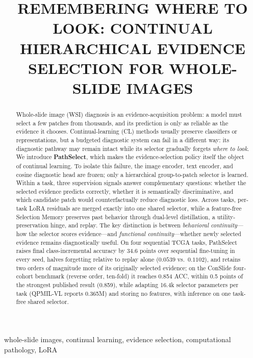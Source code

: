\documentclass{article}
\title{REMEMBERING WHERE TO LOOK: CONTINUAL HIERARCHICAL EVIDENCE SELECTION FOR WHOLE-SLIDE IMAGES}
\begin{document}
\ninept
\maketitle

\begin{abstract}
Whole-slide image (WSI) diagnosis is an evidence-acquisition problem: a model must select a few patches from thousands, and its prediction is only as reliable as the evidence it chooses.
Continual-learning (CL) methods usually preserve classifiers or representations, but a budgeted diagnostic system can fail in a different way: its diagnostic pathway may remain intact while its selector gradually forgets \emph{where to look}.
We introduce \textbf{PathSelect}, which makes the evidence-selection policy itself the object of continual learning.
To isolate this failure, the image encoder, text encoder, and cosine diagnostic head are frozen; only a hierarchical group-to-patch selector is learned.
Within a task, three supervision signals answer complementary questions: whether the selected evidence predicts correctly, whether it is semantically discriminative, and which candidate patch would counterfactually reduce diagnostic loss.
Across tasks, per-task LoRA residuals are merged exactly into one shared selector, while a feature-free Selection Memory preserves past behavior through dual-level distillation, a utility-preservation hinge, and replay.
The key distinction is between \emph{behavioral continuity}---how the selector scores evidence---and \emph{functional continuity}---whether newly selected evidence remains diagnostically useful.
On four sequential TCGA tasks, PathSelect raises final class-incremental accuracy by 34.6 points over sequential fine-tuning in every seed, halves forgetting relative to replay alone ($0.0539$ vs.\ $0.1102$), and retains two orders of magnitude more of its originally selected evidence; on the ConSlide four-cohort benchmark (reverse order, ten-fold) it reaches 0.854 ACC, within 0.5 points of the strongest published result (0.859), while adapting 16.4k selector parameters per task (QPMIL-VL reports 0.365M) and storing no features, with inference on one task-free shared selector.
\end{abstract}

\begin{keywords}
whole-slide images, continual learning, evidence selection, computational pathology, LoRA
\end{keywords}
\end{document}
